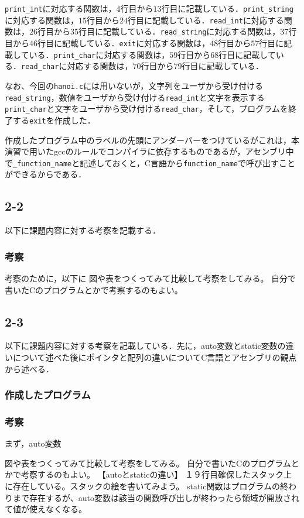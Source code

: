\documentclass[a4j,11pt]{jarticle}
\begin{document}
\verb|print_int|に対応する関数は，$4$行目から$13$行目に記載している．\verb|print_string|に対応する関数は，$15$行目から$24$行目に記載している．\verb|read_int|に対応する関数は，$26$行目から$35$行目に記載している．\verb|read_string|に対応する関数は，$37$行目から$46$行目に記載している．\verb|exit|に対応する関数は，$48$行目から$57$行目に記載している．\verb|print_char|に対応する関数は，$59$行目から$68$行目に記載している．\verb|read_char|に対応する関数は，$70$行目から$79$行目に記載している．

なお、今回の\verb|hanoi.c|には用いないが，文字列をユーザから受け付ける\verb|read_string|，数値をユーザから受け付ける\verb|read_int|と文字を表示する\verb|print_char|と文字をユーザから受け付ける\verb|read_char|，そして，プログラムを終了する\verb|exit|を作成した．
  
作成したプログラム中のラベルの先頭にアンダーバーをつけているがこれは，本演習で用いたgccのルールでコンパイラに依存するものであるが，アセンブリ中で\verb|_function_name|と記述しておくと，C言語から\verb|function_name|で呼び出すことができるからである．


 \subsection{2-2}
以下に課題内容に対する考察を記載する．
  \subsubsection{考察}
考察のために，以下に
図や表をつくってみて比較して考察をしてみる。
自分で書いたCのプログラムとかで考察するのもよい。


 \subsection{2-3}
以下に課題内容に対する考察を記載している．先に，auto変数とstatic変数の違いについて述べた後にポインタと配列の違いについてC言語とアセンブリの観点から述べる．
  \subsubsection{作成したプログラム}

  \subsubsection{考察}
まず，auto変数


図や表をつくってみて比較して考察をしてみる。
自分で書いたCのプログラムとかで考察するのもよい。
【autoとstaticの違い】
１９行目確保したスタック上に存在している。スタックの絵を書いてみよう。
static関数はプログラムの終わりまで存在するが、auto変数は該当の関数呼び出しが終わったら領域が開放されて値が使えなくなる。
\end{document}
